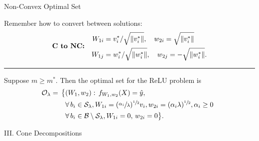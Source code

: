 \documentclass[usenames,dvipsnames,mathserif,notheorems]{beamer}
\newcommand{\horizontalrule}{
	{
			\vspace{-0.5em}
			\center \rule{\textwidth}{0.1em}
			\vspace{-0.2em}
		}
}
\begin{document}
\begin{frame}{Non-Convex Optimal Set}

	Remember how to convert between solutions:
	\begin{equation*}\label{eq:convex-to-relu}
		\textbf{C to NC:} \quad
		\begin{aligned}
			W_{1i} & = v_i^*/ \sqrt{\|v_i^*\|}, \quad w_{2i} = \sqrt{\|v_i^*\|}
			\\
			W_{1j} & = w_i^*/ \sqrt{\|w_i^*\|}, \quad w_{2j} = -\sqrt{\|w_i^*\|}.
		\end{aligned}
	\end{equation*}

	\pause
	\horizontalrule

	\begin{corollary}[Informal]
		Suppose \( m \geq m^* \).
		Then the optimal set for the ReLU problem is
		\vspace{-1ex}
		\begin{equation}\label{eq:relu-sol-fn}
			\begin{aligned}
				\hspace{-0.5em} \mathcal{O}_\lambda  = \,
				\big\{
				 & (W_1,  w_2) :
				\, f_{W_1, w_2}(X)  =  \hat y,                        \\
				 & \forall \, {b_i}  \in  \mathcal{S}_\lambda,
				W_{1i} = (\sfrac{\alpha_{i}}{\lambda})^{\sfrac{1}{2}} v_i,
				w_{2i} = (\alpha_i \lambda)^{\sfrac{1}{2}},
				\alpha_i \geq 0                                       \\
				 & \forall \, {b_i}  \in \mathcal{B} \setminus \mathcal{S}_\lambda,
				W_{1i} = 0, \, w_{2i} = 0
				\big\}.
			\end{aligned}
		\end{equation}
	\end{corollary}

\end{frame}


\begin{frame}{}
	\begin{center}
		\huge III. Cone Decompositions
	\end{center}
\end{frame}
\end{document}
